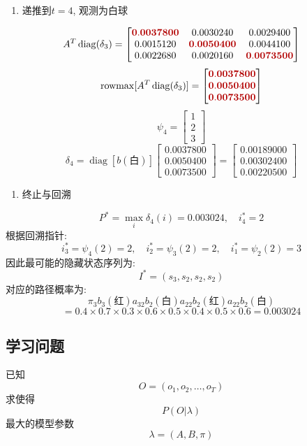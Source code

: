 \begin{enumerate}
\item[4.] 递推到$t=4$, 观测为白球
\end{enumerate}
\[
A^T \operatorname{diag}(\delta_3)
    =
    \begin{bmatrix}
    \viterbimax{0.0037800} & 0.0030240 & 0.0029400 \\
    0.0015120 & \viterbimax{0.0050400} & 0.0044100 \\
    0.0022680 & 0.0020160 & \viterbimax{0.0073500}
    \end{bmatrix}
\]
\[
\operatorname{rowmax}[A^T \operatorname{diag}(\delta_3)]
    = \begin{bmatrix}\viterbimax{0.0037800} \\ \viterbimax{0.0050400} \\ \viterbimax{0.0073500}\end{bmatrix}
\]
\[
\psi_4 = \begin{bmatrix}1 \\ 2 \\ 3\end{bmatrix}
\]
\[
\delta_4
    = \operatorname{diag}[b(\text{白})] \begin{bmatrix}0.0037800 \\ 0.0050400 \\ 0.0073500\end{bmatrix}
    = \begin{bmatrix}0.00189000 \\ 0.00302400 \\ 0.00220500\end{bmatrix}
\]

\begin{enumerate}
\item[5.] 终止与回溯
\end{enumerate}
\[
P^* = \max_i \delta_4(i) = 0.003024, \quad i_4^* = 2
\]
根据回溯指针:
\[
i_3^* = \psi_4(2) = 2, \quad
i_2^* = \psi_3(2) = 2, \quad
i_1^* = \psi_2(2) = 3
\]
因此最可能的隐藏状态序列为:
\[
I^* = (s_3, s_2, s_2, s_2)
\]
对应的路径概率为:
\[
\pi_3 b_3(\text{红}) a_{3 2} b_2(\text{白}) a_{2 2} b_2(\text{红}) a_{2 2} b_2(\text{白})
\]
\[
= 0.4 \times 0.7 \times 0.3 \times 0.6 \times 0.5 \times 0.4 \times 0.5 \times 0.6
  = 0.003024
\]

\subsection{学习问题}


已知
\[
O = (o_1, o_2, \dots, o_T)
\]
求使得
\[
P(O | \lambda)
\]
最大的模型参数
\[
\lambda = (A, B, \pi)
\]

